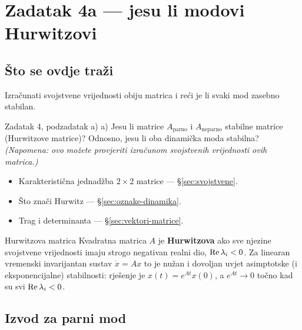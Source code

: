 \chapter{Zadatak 4a --- jesu li modovi Hurwitzovi}
\label{ch:z4-hurwitz}

\section{Što se ovdje traži}

Izračunati svojstvene vrijednosti obiju matrica i reći je li svaki mod zasebno
stabilan.

\begin{zadatak}{Zadatak 4, podzadatak a)}
a) Jesu li matrice $A_{\mathrm{parno}}$ i $A_{\mathrm{neparno}}$ stabilne matrice
(Hurwitzove matrice)? Odnosno, jesu li oba dinamička moda stabilna?
\emph{(Napomena: ovo možete provjeriti izračunom svojstvenih vrijednosti ovih
matrica.)}
\end{zadatak}

\begin{predznanje}
\begin{itemize}[nosep,leftmargin=*]
  \item Karakteristična jednadžba $2\times2$ matrice --- \S\ref{sec:svojstvene}.
  \item Što znači Hurwitz --- \S\ref{sec:oznake-dinamika}.
  \item Trag i determinanta --- \S\ref{sec:vektori-matrice}.
\end{itemize}
\end{predznanje}

\begin{pojam}{Hurwitzova matrica}
Kvadratna matrica $A$ je \textbf{Hurwitzova} ako sve njezine svojstvene
vrijednosti imaju strogo negativan realni dio, $\operatorname{Re} \lambda_i < 0$. Za linearan
vremenski invarijantan sustav $\dot{x} = Ax$ to je nužan i dovoljan uvjet
asimptotske (i eksponencijalne) stabilnosti: rješenje je
$x(t) = e^{At}x(0)$, a $e^{At} \to 0$ točno kad su svi $\operatorname{Re} \lambda_i < 0$.
\end{pojam}

\section{Izvod za parni mod}
\label{sec:z4-parni}

